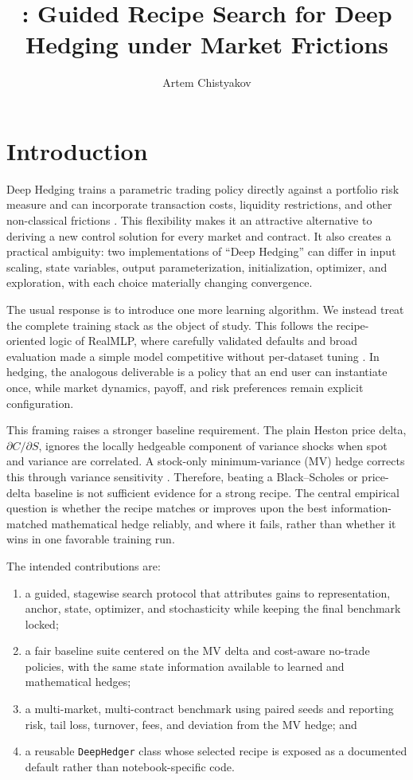 \documentclass[sigconf,balance=false]{acmart}
\title{\methodname: Guided Recipe Search for Deep Hedging under Market Frictions}
\author{Artem Chistyakov}
\affiliation{%
  \institution{HSE University}
  \city{Moscow}
  \country{Russia}
}
\affiliation{%
  \institution{Yandex Research}
  \city{Moscow}
  \country{Russia}
}
\begin{document}
\maketitle

\section{Introduction}

Deep Hedging trains a parametric trading policy directly against a portfolio
risk measure and can incorporate transaction costs, liquidity restrictions, and
other non-classical frictions \cite{buehler2019deep}.  This flexibility makes it
an attractive alternative to deriving a new control solution for every market
and contract.  It also creates a practical ambiguity: two implementations of
``Deep Hedging'' can differ in input scaling, state variables, output
parameterization, initialization, optimizer, and exploration, with each choice
materially changing convergence.

The usual response is to introduce one more learning algorithm.  We instead
treat the complete training stack as the object of study.  This follows the
recipe-oriented logic of RealMLP, where carefully validated defaults and broad
evaluation made a simple model competitive without per-dataset tuning
\cite{holzmueller2024better}.  In hedging, the analogous deliverable is a
policy that an end user can instantiate once, while market dynamics, payoff,
and risk preferences remain explicit configuration.

This framing raises a stronger baseline requirement.  The plain Heston price
delta, $\partial C/\partial S$, ignores the locally hedgeable component of
variance shocks when spot and variance are correlated.  A stock-only
minimum-variance (MV) hedge corrects this through variance sensitivity
\cite{hull2017optimal}.  Therefore, beating a Black--Scholes or price-delta
baseline is not sufficient evidence for a strong recipe.  The central empirical
question is whether the recipe matches or improves upon the best
information-matched mathematical hedge reliably, and where it fails, rather
than whether it wins in one favorable training run.

The intended contributions are:

\begin{enumerate}
  \item a guided, stagewise search protocol that attributes gains to
  representation, anchor, state, optimizer, and stochasticity while keeping the
  final benchmark locked;
  \item a fair baseline suite centered on the MV delta and cost-aware
  no-trade policies, with the same state information available to learned and
  mathematical hedges;
  \item a multi-market, multi-contract benchmark using paired seeds and
  reporting risk, tail loss, turnover, fees, and deviation from the MV hedge;
  and
  \item a reusable \texttt{DeepHedger} class whose selected recipe is exposed as
  a documented default rather than notebook-specific code.
\end{enumerate}
\end{document}
